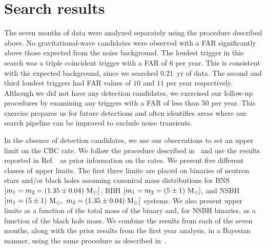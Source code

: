 \section{Search results}
\label{sec:results}

The seven months of data were analyzed separately using the procedure
described above. No gravitational-wave candidates were observed with a
\ac{FAR} significantly above those expected from the noise background.  The
loudest trigger in this search was a triple coincident trigger with a FAR of
$6$ per year. This is consistent with the expected background, since we
searched $0.21$~yr of data. The second and third loudest triggers had FAR
values of $10$ and $11$ per year respectively. Although we did not have any
detection candidates, we exercised our follow-up procedures by
examining any triggers with a \ac{FAR} of less than $50$ per year. 
This exercise prepares us for future detections and often identifies areas
where our search pipeline can be improved to exclude noise transients.

In the absence of detection candidates, we use our observations to set an
upper limit on the CBC rate. We follow the procedure described
in~\cite{Fairhurst:2007qj,loudestGWDAW03,Biswas:2007ni} 
and use the results reported in
Ref.~\cite{Collaboration:2009tt} as prior information on the rates.
We present five different classes of upper limits.  The
first three limits are placed on binaries of neutron stars and/or black
holes assuming canonical mass distributions for \ac{BNS} $[m_1 = m_2 =
(1.35\pm 0.04)~\mathrm{M_\odot}]$, \ac{BBH} $[m_1 = m_2 = (5\pm 1)~\mathrm{M_\odot}]$, and
\ac{NSBH} $[m_1 = (5\pm 1)~\mathrm{M_\odot},~m_2 = (1.35\pm 0.04)~\mathrm{M_\odot}]$ systems.
We also present upper limits as a function of the total mass of the
binary and, for \ac{NSBH} binaries, as a function of the black hole
mass. We combine the results from each of the seven
months, along with the prior results from the first year analysis, in a
Bayesian manner, using the same procedure as described
in~\cite{Collaboration:2009tt}.

